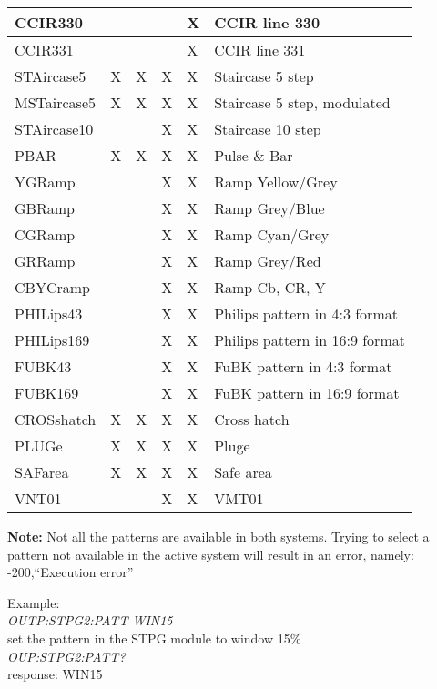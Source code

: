 \begin{center}
\begin{tabular}{|l|l|l|l|l|l|}
CCIR330										&						&							&						& X					& CCIR line 330\\ \hline
CCIR331										&						&							&						& X					& CCIR line 331\\ \hline
STAircase5								& X					& X						& X					& X					& Staircase 5 step\\ \hline
MSTaircase5								& X					& X						& X					& X					& Staircase 5 step, modulated\\ \hline
STAircase10								&						&							& X					& X					& Staircase 10 step\\ \hline
PBAR											& X					& X						& X					& X					& Pulse \& Bar\\ \hline
YGRamp										&						&							& X					& X					& Ramp Yellow/Grey\\ \hline
GBRamp										&						&							& X					& X					& Ramp Grey/Blue\\ \hline
CGRamp										&						&							& X					& X					& Ramp Cyan/Grey\\ \hline
GRRamp										&						&							& X					& X					& Ramp Grey/Red\\ \hline
CBYCramp									&						&							& X					& X					& Ramp Cb, CR, Y\\ \hline
PHILips43									&						&							& X					& X					& Philips pattern in 4:3 format\\ \hline
PHILips169								&						&							& X					& X					& Philips pattern in 16:9 format\\ \hline
FUBK43										&						&							& X					& X					& FuBK pattern in 4:3 format\\ \hline
FUBK169										&						&							& X					& X					& FuBK pattern in 16:9 format\\ \hline
CROSshatch								& X					& X						& X					& X					& Cross hatch\\ \hline
PLUGe											& X					& X						& X					& X					& Pluge\\ \hline
SAFarea										& X					& X						& X					& X					& Safe area\\ \hline
VNT01											&						&							& X					& X					& VMT01\\ \hline
\end{tabular}
\end{center}

\textbf{Note:} Not all the patterns are available in both systems. Trying to select a pattern not available in the active system will result in an error, namely: -200,``Execution error'' 

Example:\\
\textit{OUTP:STPG2:PATT WIN15}\\
set the pattern in the STPG module to window 15\%\\
\textit{OUP:STPG2:PATT?}\\
response: WIN15

